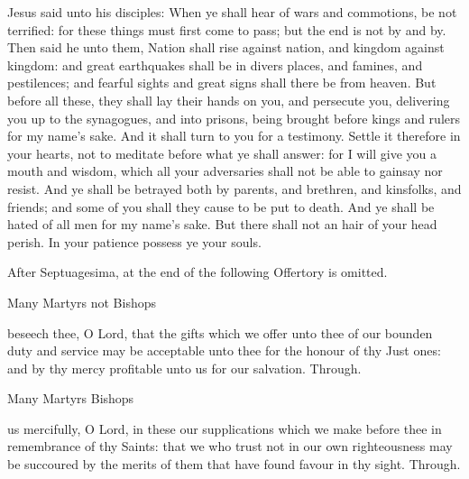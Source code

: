 \label{CommonMartyrsIGospel}
 Jesus said unto his disciples: When ye shall hear of wars and commotions, be not terrified: for these things must first come to pass; but the end is not by and by. Then said he unto them, Nation shall rise against nation, and kingdom against kingdom: and great earthquakes shall be in divers places, and famines, and pestilences; and fearful sights and great signs shall there be from heaven. But before all these, they shall lay their hands on you, and persecute you, delivering you up to the synagogues, and into prisons, being brought before kings and rulers for my name's sake. And it shall turn to you for a testimony. Settle it therefore in your hearts, not to meditate before what ye shall answer: for I will give you a mouth and wisdom, which all your adversaries shall not be able to gainsay nor resist. And ye shall be betrayed both by parents, and brethren, and kinsfolks, and friends; and some of you shall they cause to be put to death. And ye shall be hated of all men for my name's sake. But there shall not an hair of your head perish. In your patience possess ye your souls.

\begin{rubric}
	After Septuagesima,  at the end of the following Offertory is omitted.
\end{rubric}


\secret\label{CommonMartyrsISecret}
\begin{inhead}
	Many Martyrs not Bishops
\end{inhead}
 beseech thee, O Lord, that the gifts which we offer unto thee of our bounden duty and service may be acceptable unto thee for the honour of thy Just ones: and by thy mercy profitable unto us for our salvation. Through.

\clearpage
\begin{inhead}
	Many Martyrs Bishops
\end{inhead}
 us mercifully, O Lord, in these our supplications which we make before thee in remembrance of thy Saints: that we who trust not in our own righteousness may be succoured by the merits of them that have found favour in thy sight. Through.


